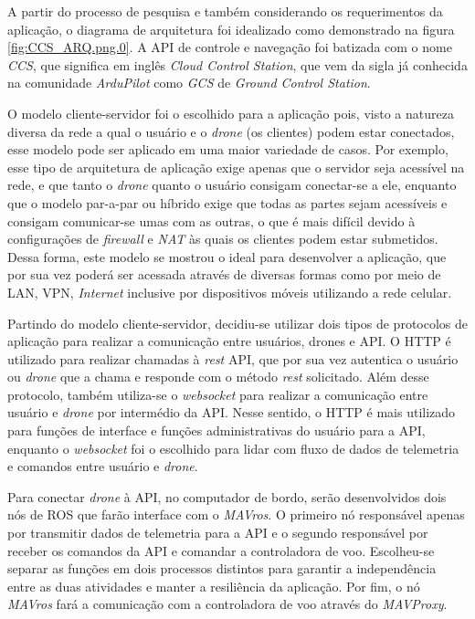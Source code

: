 \documentclass[12pt,a4paper,oneside]{book}
\begin{document}
A partir do processo de pesquisa e também considerando os requerimentos da aplicação, o diagrama de arquitetura foi idealizado como demonstrado na figura \ref{fig:CCS_ARQ.png.0}. A API de controle e navegação foi batizada com o nome \textit{CCS}, que significa em inglês \textit{Cloud Control Station}, que vem da sigla já conhecida na comunidade \textit{ArduPilot} como \textit{GCS} de \textit{Ground Control Station}.   

O modelo cliente-servidor foi o escolhido para a aplicação pois, visto a natureza diversa da rede a qual o usuário e o \textit{drone} (os clientes) podem estar conectados, esse modelo pode ser aplicado em uma maior variedade de casos. Por exemplo, esse tipo de arquitetura de aplicação exige apenas que o servidor seja acessível na rede, e que tanto o \textit{drone} quanto o usuário consigam conectar-se a ele, enquanto que o modelo par-a-par ou híbrido exige que todas as partes sejam acessíveis e consigam comunicar-se umas com as outras, o que é mais difícil devido à configurações de \textit{firewall} e \textit{NAT} às quais os clientes podem estar submetidos. Dessa forma, este modelo se mostrou o ideal para desenvolver a aplicação, que por sua vez poderá ser acessada através de diversas formas como por meio de LAN, VPN, \textit{Internet} inclusive por dispositivos móveis utilizando a rede celular.

Partindo do modelo cliente-servidor, decidiu-se utilizar dois tipos de protocolos de aplicação para realizar a comunicação entre usuários, drones e API. O HTTP é utilizado para realizar chamadas à \textit{rest} API, que por sua vez autentica o usuário ou \textit{drone} que a chama e responde com o método \textit{rest} solicitado. Além desse protocolo, também utiliza-se o \textit{websocket} para realizar a comunicação entre usuário e \textit{drone} por intermédio da API. Nesse sentido, o HTTP é mais utilizado para funções de interface e funções administrativas do usuário para a API, enquanto o \textit{websocket} foi o escolhido para lidar com fluxo de dados de telemetria e comandos entre usuário e \textit{drone}. 

Para conectar \textit{drone} à API, no computador de bordo, serão desenvolvidos dois nós de ROS que farão interface com o \textit{MAVros}. O primeiro nó responsável apenas por transmitir dados de telemetria para a API e o segundo responsável por receber os comandos da API e comandar a controladora de voo. Escolheu-se separar as funções em dois processos distintos para garantir a independência entre as duas atividades e manter a resiliência da aplicação. Por fim, o nó \textit{MAVros} fará a comunicação com a controladora de voo através do \textit{MAVProxy}.
\end{document}
